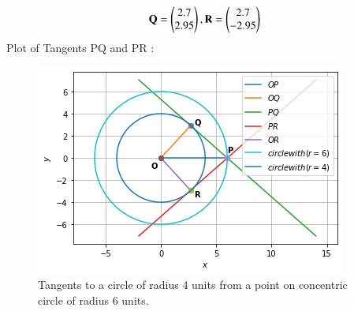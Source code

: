 \documentclass[journal,12pt,twocolumn]{IEEEtran}
\begin{document}
\begin{align}
\mathbf{Q}=\begin{pmatrix}2.7\\2.95\end{pmatrix},
\mathbf{R}=\begin{pmatrix}2.7\\-2.95\end{pmatrix}
\end{align}
Plot of Tangents PQ and PR :
\begin{figure}[ht]
    \centering
    \includegraphics[width=\columnwidth]{TANGENT.png}
    \caption{Tangents to a circle of radius 4 units from a point on concentric circle of radius 6 units.}
    \label{fig:Tangents to a circle of radius 4 units from a point on concentric circle of radius 6 units.}
\end{figure}    
\end{document}
